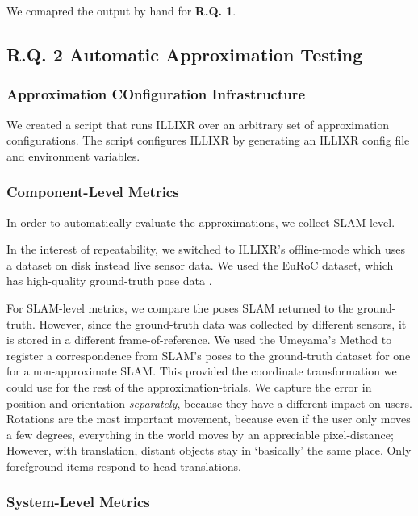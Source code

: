 We comapred the output by hand for \textbf{R.Q. 1}.


\subsection{R.Q. 2 Automatic Approximation Testing}

\subsubsection{Approximation COnfiguration Infrastructure}

We created a script that runs ILLIXR over an arbitrary set of approximation configurations. The script configures ILLIXR by generating an ILLIXR config file and environment variables.

\subsubsection{Component-Level Metrics}

In order to automatically evaluate the approximations, we collect SLAM-level.

In the interest of repeatability, we switched to ILLIXR's offline-mode which uses a dataset on disk instead live sensor data. We used the EuRoC dataset, which has high-quality ground-truth pose data \cite{Burri25012016}.

For SLAM-level metrics, we compare the poses SLAM returned to the ground-truth. However, since the ground-truth data was collected by different sensors, it is stored in a different frame-of-reference. We used the Umeyama's Method to register a correspondence from SLAM's poses to the ground-truth dataset for one for a non-approximate SLAM\cite{88573}. This provided the coordinate transformation we could use for the rest of the approximation-trials. We capture the error in position and orientation \textit{separately}, because they have a different impact on users. Rotations are the most important movement, because even if the user only moves a few degrees, everything in the world moves by an appreciable pixel-distance; However, with translation, distant objects stay in `basically' the same place. Only forefground items respond to head-translations.

\subsubsection{System-Level Metrics}

